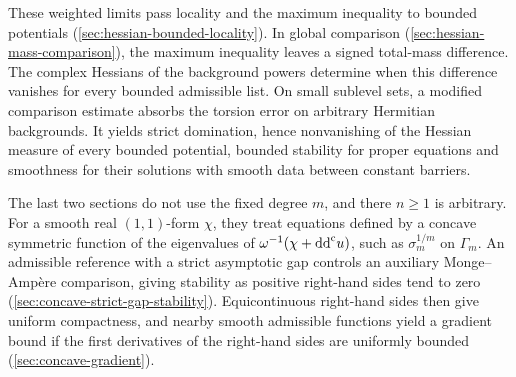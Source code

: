 These weighted limits pass locality and the maximum inequality to
bounded potentials (\cref{sec:hessian-bounded-locality}). In global
comparison (\cref{sec:hessian-mass-comparison}), the maximum inequality
leaves a signed total-mass difference. The complex Hessians of the
background powers determine when this difference vanishes for every
bounded admissible list. On small sublevel sets, a modified comparison
estimate absorbs the torsion error on arbitrary Hermitian backgrounds.
It yields strict domination, hence nonvanishing of the Hessian
measure of every bounded potential, bounded stability for proper
equations and smoothness for their solutions with smooth data between
constant barriers.

The last two sections do not use the fixed degree $m$, and there $n\geq1$
is arbitrary. For a smooth real $(1,1)$-form $\chi$, they treat equations
defined by a concave symmetric function of the eigenvalues of
$\omega^{-1}(\chi+\mathrm{dd}^{\mathrm{c}} u)$, such as $\sigma_m^{1/m}$ on $\Gamma_m$. An
admissible reference with a strict asymptotic gap controls an auxiliary
Monge--Amp\`ere comparison, giving stability as positive right-hand sides
tend to zero (\cref{sec:concave-strict-gap-stability}). Equicontinuous
right-hand sides then give uniform compactness, and nearby smooth
admissible functions yield a gradient bound if the first derivatives of
the right-hand sides are uniformly bounded (\cref{sec:concave-gradient}).















